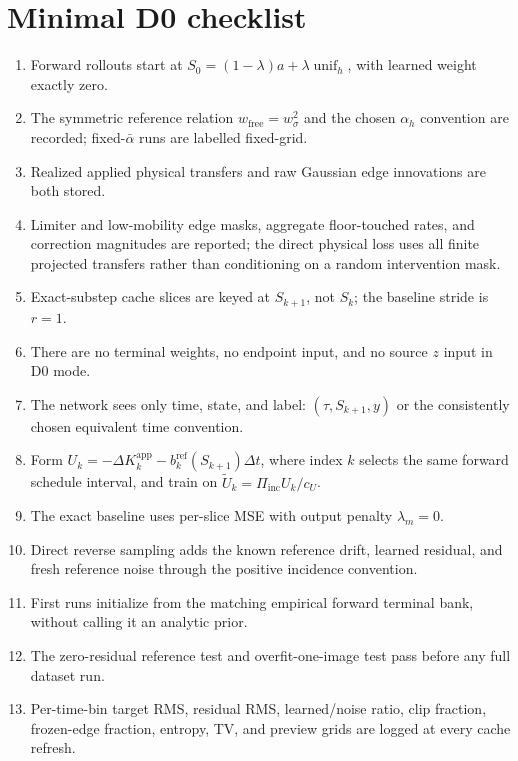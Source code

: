 \documentclass[11pt]{article}
\numberwithin{equation}{section}
\newcommand{\unif}{\operatorname{unif}_h}
\newcommand{\1}{\mathbf 1}
\begin{document}
\appendix
\section{Minimal D0 checklist}

\begin{enumerate}[leftmargin=2.0em]
  \item Forward rollouts start at \(S_0=(1-\lambda)a+\lambda\unif\), with learned weight exactly zero.
  \item The symmetric reference relation \(w_{\mathrm{free}}=w_\sigma^2\) and the chosen \(\alpha_h\) convention are recorded; fixed-\(\bar\alpha\) runs are labelled fixed-grid.
  \item Realized applied physical transfers and raw Gaussian edge innovations are both stored.
  \item Limiter and low-mobility edge masks, aggregate floor-touched rates, and correction magnitudes are reported; the direct physical loss uses all finite projected transfers rather than conditioning on a random intervention mask.
  \item Exact-substep cache slices are keyed at \(S_{k+1}\), not \(S_k\); the baseline stride is \(r=1\).
  \item There are no terminal weights, no endpoint input, and no source \(z\) input in D0 mode.
  \item The network sees only time, state, and label: \((\tau,S_{k+1},y)\) or the consistently chosen equivalent time convention.
  \item Form \(U_k=-\Delta K_k^{\mathrm{app}}-b_k^{\mathrm{ref}}(S_{k+1})\Delta t\), where index \(k\) selects the same forward schedule interval, and train on \(\widetilde U_k=\Pi_{\mathrm{inc}}U_k/c_U\).
  \item The exact baseline uses per-slice MSE with output penalty \(\lambda_m=0\).
  \item Direct reverse sampling adds the known reference drift, learned residual, and fresh reference noise through the positive incidence convention.
  \item First runs initialize from the matching empirical forward terminal bank, without calling it an analytic prior.
  \item The zero-residual reference test and overfit-one-image test pass before any full dataset run.
  \item Per-time-bin target RMS, residual RMS, learned/noise ratio, clip fraction, frozen-edge fraction, entropy, TV, and preview grids are logged at every cache refresh.
\end{enumerate}
\end{document}
